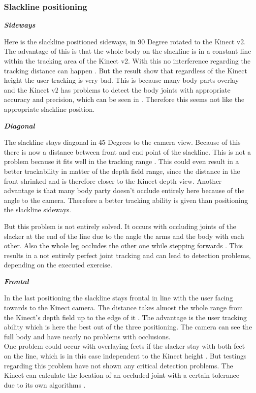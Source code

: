 \subsubsection{Slackline positioning}
\textit{\textbf{Sideways}}


Here is the slackline positioned sideways, in 90 Degree rotated to the Kinect v2. The advantage of this is that the whole body on the slackline is in a constant line within the tracking area of the Kinect v2. With this no interference regarding the tracking distance can happen \textbf{}. But the result show that regardless of the Kinect height the user tracking is very bad. This is because many body parts overlay and the Kinect v2 has problems to detect the body joints with appropriate accuracy and precision, which can be seen in \textbf{}. Therefore this seems not like the appropriate slackline position.

\textit{\textbf{Diagonal}}

The slackline stays diagonal in 45 Degrees to the camera view. Because of this there is now a distance between front and end point of the slackline. This is not a problem because it fits well in the tracking range \textbf{}. This could even result in a better trackability in matter of the depth field range, since the distance in the front shrinked and is therefore closer to the Kinect depth view. Another advantage is that many body party doesn't occlude entirely here because of the angle to the camera. Therefore a better tracking ability is given than positioning the slackline sideways.

But this problem is not entirely solved. It occurs with occluding joints of the slacker at the end of the line due to the angle the arms and the body \textbf{} with each other. Also the whole leg occludes the other one while stepping forwards \textbf{}. This results in a not entirely perfect joint tracking and can lead to detection problems, depending on the executed exercise.

\textit{\textbf{Frontal}}

In the last positioning the slackline stays frontal in line with the user facing towards to the Kinect camera. The distance takes almost the whole range from the Kinect’s depth field up to the edge of it \textbf{}. The advantage is the user tracking ability which is here the best out of the three positioning. The camera can see the full body and have nearly no problems with occlusions.\\
One problem could occur with overlaying feets if the slacker stay with both feet on the line, which is in this case independent to the Kinect height \textbf{}. But testings regarding this problem have not shown any critical detection problems. The Kinect can calculate the location of an occluded joint with a certain tolerance due to its own algorithms \textbf{\todo{[CITE]}}.


